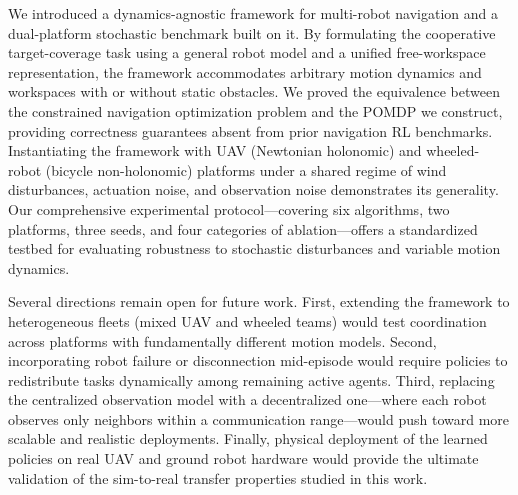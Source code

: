 \documentclass{article}
\begin{document}
We introduced a dynamics-agnostic framework for multi-robot navigation and a dual-platform stochastic benchmark built on it. By formulating the cooperative target-coverage task using a general robot model and a unified free-workspace representation, the framework accommodates arbitrary motion dynamics and workspaces with or without static obstacles. We proved the equivalence between the constrained navigation optimization problem and the POMDP we construct, providing correctness guarantees absent from prior navigation RL benchmarks. Instantiating the framework with UAV (Newtonian holonomic) and wheeled-robot (bicycle non-holonomic) platforms under a shared regime of wind disturbances, actuation noise, and observation noise demonstrates its generality. Our comprehensive experimental protocol---covering six algorithms, two platforms, three seeds, and four categories of ablation---offers a standardized testbed for evaluating robustness to stochastic disturbances and variable motion dynamics.

Several directions remain open for future work. First, extending the framework to heterogeneous fleets (mixed UAV and wheeled teams) would test coordination across platforms with fundamentally different motion models. Second, incorporating robot failure or disconnection mid-episode would require policies to redistribute tasks dynamically among remaining active agents. Third, replacing the centralized observation model with a decentralized one---where each robot observes only neighbors within a communication range---would push toward more scalable and realistic deployments. Finally, physical deployment of the learned policies on real UAV and ground robot hardware would provide the ultimate validation of the sim-to-real transfer properties studied in this work.


\clearpage

\end{document}
